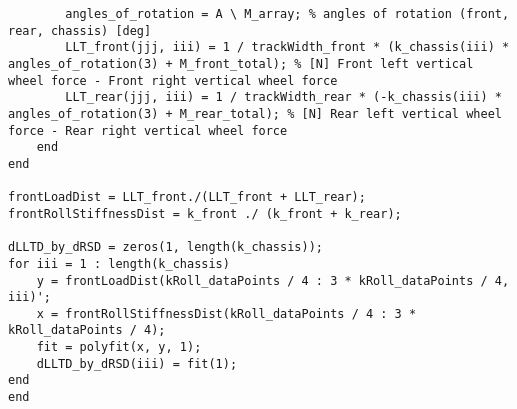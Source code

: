 \begin{lstlisting}
		angles_of_rotation = A \ M_array; % angles of rotation (front, rear, chassis) [deg]
		LLT_front(jjj, iii) = 1 / trackWidth_front * (k_chassis(iii) * angles_of_rotation(3) + M_front_total); % [N] Front left vertical wheel force - Front right vertical wheel force
		LLT_rear(jjj, iii) = 1 / trackWidth_rear * (-k_chassis(iii) * angles_of_rotation(3) + M_rear_total); % [N] Rear left vertical wheel force - Rear right vertical wheel force
	end
end

frontLoadDist = LLT_front./(LLT_front + LLT_rear);
frontRollStiffnessDist = k_front ./ (k_front + k_rear);

dLLTD_by_dRSD = zeros(1, length(k_chassis));
for iii = 1 : length(k_chassis)
	y = frontLoadDist(kRoll_dataPoints / 4 : 3 * kRoll_dataPoints / 4, iii)';
	x = frontRollStiffnessDist(kRoll_dataPoints / 4 : 3 * kRoll_dataPoints / 4);
	fit = polyfit(x, y, 1);
	dLLTD_by_dRSD(iii) = fit(1);
end
end
\end{lstlisting}
	
